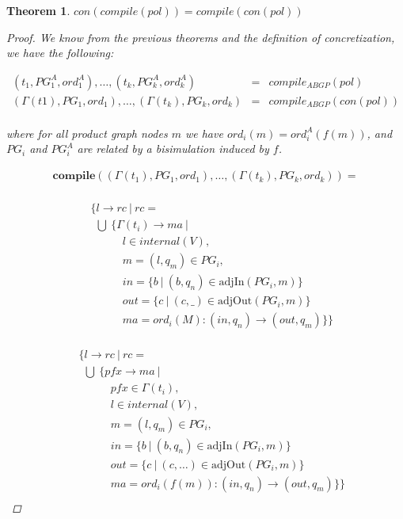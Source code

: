 \documentclass[twocolumn]{sig-alternate-10pt}
\newtheorem{thm}{Theorem}[section]
\begin{document}
\begin{thm}
  $con(compile(pol)) = compile(con(pol))$

  \begin{proof}

    We know from the previous theorems and the definition of concretization, we have the following:

    \[ \begin{array}{lll}
       (t_1, PG^A_1, ord^A_1), \dots, (t_k,PG^A_k,ord^A_k)    &=& compile_{ABGP}(pol) \\
       (\Gamma(t1), PG_1, ord_1), \dots, (\Gamma(t_k),PG_k,ord_k)  &=& compile_{ABGP}(con(pol)) \\
    \end{array} \]%

    where for all product graph nodes $m$ we have $ord_i(m) = ord^A_i(f(m))$, and $PG_i$ and $PG^A_i$ are related by a bisimulation induced by $f$.

  \[ \begin{array}{l}
     \textbf{compile}( (\Gamma(t_1),PG_1,ord_1), \dots, (\Gamma(t_k),PG_k,ord_k) ) = \\
  \end{array} \]%

  \[ \begin{array}{l}
     ~~~~~ \{ l \rightarrow rc ~\vert~ rc = \\
     ~~~~~~~ \bigcup~ \{ \Gamma(t_i) \rightarrow ma ~\vert~ \\
     ~~~~~~~~~~~~~~~~~~ l \in internal(V), \\
     ~~~~~~~~~~~~~~~~~~ m = (l,q_m) \in PG_i, \\
     ~~~~~~~~~~~~~~~~~~ in = \{ b ~\vert~ (b,q_n) \in \text{adjIn}(PG_i,m) \} \\
     ~~~~~~~~~~~~~~~~~~ out = \{ c ~\vert~ (c,\_) \in \text{adjOut}(PG_i,m) \} \\
     ~~~~~~~~~~~~~~~~~~ ma = ord_i(M) : (in,q_n) \rightarrow (out,q_m) \} \} \\
  \end{array} \]%

  \[ \begin{array}{l}
     ~~~~~ \{ l \rightarrow rc ~\vert~ rc = \\
     ~~~~~~~ \bigcup~ \{ pfx \rightarrow ma ~\vert~ \\
     ~~~~~~~~~~~~~~~~~~ pfx \in \Gamma(t_i), \\
     ~~~~~~~~~~~~~~~~~~ l \in internal(V), \\
     ~~~~~~~~~~~~~~~~~~ m = (l,q_m) \in PG_i, \\
     ~~~~~~~~~~~~~~~~~~ in = \{ b ~\vert~ (b,q_n) \in \text{adjIn}(PG_i,m) \} \\
     ~~~~~~~~~~~~~~~~~~ out = \{ c ~\vert~ (c,\dots) \in \text{adjOut}(PG_i,m) \} \\ 
     ~~~~~~~~~~~~~~~~~~ ma = ord_i(f(m)) : (in,q_n) \rightarrow (out,q_m) \} \} \\
  \end{array} \]%


\end{proof}
\end{thm}
\end{document}
